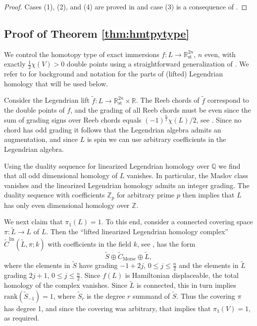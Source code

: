 \documentclass[reqno,11pt]{amsart}
\numberwithin{equation}{section}
\theoremstyle{my}
\theoremstyle{my}
\theoremstyle{your}
\newcommand{\R}{\mathbb{R}}
\newcommand{\Z}{\mathbb{Z}}
\newcommand{\Q}{\mathbb{Q}}
\newcommand{\rk}{\mathrm{rank}}
\newcommand{\st}{\mathrm{st}}
\begin{document}
\begin{proof}
Cases (1), (2), and (4) are proved in \cite{Audin} and case (3) is a consequence of \cite{AsaEcc}.
\end{proof}




\subsection{Proof of Theorem \ref{thm:hmtpytype}}\label{ssec:proofhmtpytype}
We control the homotopy type of exact immersions $f\colon L\to\R^{2n}_\st$, $n$ even,  with exactly $\frac{1}{2}\chi(V)>0$ double points using a straightforward generalization of \cite[Lemma 2.2]{ES2}. We refer to \cite[Section 2]{ES2} for background and notation for the parts of (lifted) Legendrian homology that will be used below.  

Consider the Legendrian lift $\tilde f\colon L\to \R^{2n}_\st\times\R$. The Reeb chords of $\tilde f$ correspond to the double points of $f$, and the grading of all Reeb chords must be even since the sum of grading signs over Reeb chords equals $(-1)^{\frac{n}{2}}\chi(L)/2$, see \cite{EkEtSu}. Since no chord has odd grading it follows that the Legendrian algebra admits an augmentation, and since $L$ is spin we can use arbitrary coefficients in the Legendrian algebra.


Using the duality sequence for linearized Legendrian homology \cite{EESa} over $\Q$ we find that all odd dimensional homology of $L$ vanishes. In particular, the Maslov class vanishes and the linearized Legendrian homology admits an integer grading. The duality sequence with coefficients $\Z_{p}$ for arbitrary prime $p$ then implies that $L$ has only even dimensional homology over $\Z$.

We next claim that $\pi_1(L) = 1$. To this end, consider a connected covering space $\pi\colon \tilde L\to L$ of $L$. Then the ``lifted linearized Legendrian homology complex'' $\tilde{C}^{\mathrm{lin}}(\tilde L,\pi;k)$ with coefficients in the field $k$, see \cite[Section 2]{ES2}, has the form
\[
\tilde S\oplus \tilde C_{\mathrm{Morse}} \oplus \tilde L,
\]
where the elements in $\tilde S$ have grading $-1+2j$, $0\le j \le \frac{n}{2}$ and the elements in $\tilde L$ grading $2j+1$, $0\le j\le\frac{n}{2}$. Since $f(L)$ is Hamiltonian displaceable, the total homology of the complex vanishes. Since $\tilde{L}$ is connected, this in turn implies $\rk(\tilde S_{-1})=1$, where $\tilde S_{r}$ is the degree $r$ summand of $\tilde S$. Thus the covering $\pi$ has degree 1, and since the covering was arbitrary, that implies that $\pi_1(V) = 1$, as required.
\end{document}
